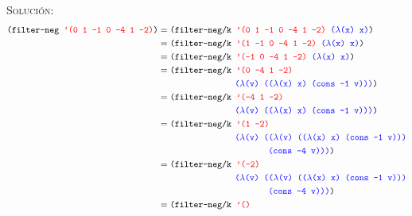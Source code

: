 \documentclass[letterpaper,11pt]{article}
\begin{document}
\begin{enumerate}
\begin{enumerate}
        \textsc{Solución:}
        \begin{align*}
            \texttt{(filter-neg \textcolor{red}{'(0 1 -1 0 -4 1 -2)})}
            &= \texttt{(filter-neg/k
                        \textcolor{red}{'(0 1 -1 0 -4 1 -2)}
                        \textcolor{blue}{($\lambda$(x) x)})} \\ 
            &= \texttt{(filter-neg/k 
                        \textcolor{red}{'(1 -1 0 -4 1 -2)}
                        \textcolor{blue}{($\lambda$(x) x)})} \\ 
            &= \texttt{(filter-neg/k 
                        \textcolor{red}{'(-1 0 -4 1 -2)}
                        \textcolor{blue}{($\lambda$(x) x)})} \\ 
            &= \texttt{(filter-neg/k 
                        \textcolor{red}{'(0 -4 1 -2)}} \\ 
            & \quad \quad \quad \quad \quad \quad \quad \quad \; \;
            \texttt{\textcolor{blue}{($\lambda$(v) (($\lambda$(x) x) (cons -1 v)))})} \\
            &= \texttt{(filter-neg/k 
                        \textcolor{red}{'(-4 1 -2)}} \\ 
            & \quad \quad \quad \quad \quad \quad \quad \quad \; \;
            \texttt{\textcolor{blue}{($\lambda$(v) (($\lambda$(x) x) (cons -1 v)))})} \\
            &= \texttt{(filter-neg/k 
                        \textcolor{red}{'(1 -2)}} \\ 
            & \quad \quad \quad \quad \quad \quad \quad \quad \; \;
            \texttt{\textcolor{blue}{($\lambda$(v) (($\lambda$(v) (($\lambda$(x) x) (cons -1 v)))}} \\ 
            & \quad \quad \quad \quad \quad \quad \quad \quad \quad \quad \quad \quad \;
            \texttt{\textcolor{blue}{(cons -4 v)))})} \\ 
            &= \texttt{(filter-neg/k 
                        \textcolor{red}{'(-2)}} \\ 
            & \quad \quad \quad \quad \quad \quad \quad \quad \; \;
            \texttt{\textcolor{blue}{($\lambda$(v) (($\lambda$(v) (($\lambda$(x) x) (cons -1 v)))}} \\ 
            & \quad \quad \quad \quad \quad \quad \quad \quad \quad \quad \quad \quad \;
            \texttt{\textcolor{blue}{(cons -4 v)))})} \\ 
            &= \texttt{(filter-neg/k
                        \textcolor{red}{'()}} \\ 

\end{align*}
\end{enumerate}
\end{enumerate}
\end{document}
